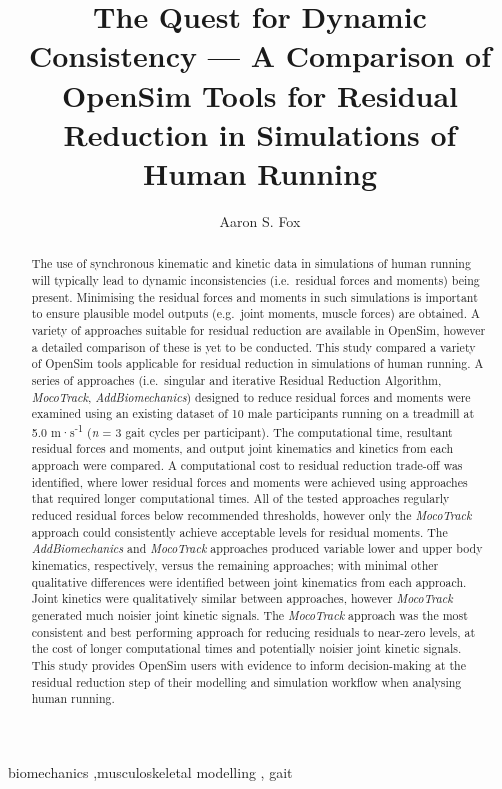 \documentclass[]{elsarticle} %
\begin{document}
\begin{frontmatter}

  \title{The Quest for Dynamic Consistency --- A Comparison of OpenSim
Tools for Residual Reduction in Simulations of Human Running}
    \author[School of Exercise and Nutrition Sciences]{Aaron S. Fox%
  }
  
  
  \begin{abstract}
  The use of synchronous kinematic and kinetic data in simulations of
  human running will typically lead to dynamic inconsistencies
  (i.e.~residual forces and moments) being present. Minimising the
  residual forces and moments in such simulations is important to ensure
  plausible model outputs (e.g.~joint moments, muscle forces) are
  obtained. A variety of approaches suitable for residual reduction are
  available in OpenSim, however a detailed comparison of these is yet to
  be conducted. This study compared a variety of OpenSim tools
  applicable for residual reduction in simulations of human running. A
  series of approaches (i.e.~singular and iterative Residual Reduction
  Algorithm, \emph{MocoTrack}, \emph{AddBiomechanics}) designed to
  reduce residual forces and moments were examined using an existing
  dataset of 10 male participants running on a treadmill at 5.0
  m·s\textsuperscript{-1} (\emph{n} = 3 gait cycles per participant).
  The computational time, resultant residual forces and moments, and
  output joint kinematics and kinetics from each approach were compared.
  A computational cost to residual reduction trade-off was identified,
  where lower residual forces and moments were achieved using approaches
  that required longer computational times. All of the tested approaches
  regularly reduced residual forces below recommended thresholds,
  however only the \emph{MocoTrack} approach could consistently achieve
  acceptable levels for residual moments. The \emph{AddBiomechanics} and
  \emph{MocoTrack} approaches produced variable lower and upper body
  kinematics, respectively, versus the remaining approaches; with
  minimal other qualitative differences were identified between joint
  kinematics from each approach. Joint kinetics were qualitatively
  similar between approaches, however \emph{MocoTrack} generated much
  noisier joint kinetic signals. The \emph{MocoTrack} approach was the
  most consistent and best performing approach for reducing residuals to
  near-zero levels, at the cost of longer computational times and
  potentially noisier joint kinetic signals. This study provides OpenSim
  users with evidence to inform decision-making at the residual
  reduction step of their modelling and simulation workflow when
  analysing human running.
  \end{abstract}
    \begin{keyword}
    biomechanics \sep musculoskeletal modelling \sep 
    gait
  \end{keyword}
  
 \end{frontmatter}
\end{document}
